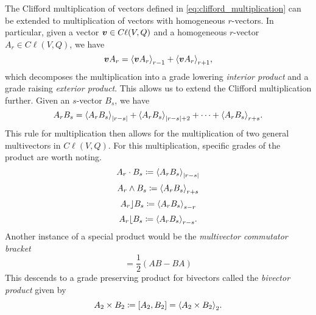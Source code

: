 The Clifford multiplication of vectors defined in \ref{eq:clifford_multiplication} can be extended to multiplication of vectors with homogeneous $r$-vectors.  In particular, given a vector $\boldsymbol{v} \in C\ell(V,Q)$ and a homogeneous $r$-vector $A_r \in C\ell(V,Q)$, we have
\begin{equation}
\label{eq:vector_multiplication}
\blade{v}A_r = \proj{r-1}{\blade{v}A_r} + \proj{r+1}{\blade{v}A_r},
\end{equation}
which decomposes the multiplication into a grade lowering \emph{interior product} and a grade raising \emph{exterior product}.  This allows us to extend the Clifford multiplication further. Given an $s$-vector $B_s$, we have
\begin{equation}
\label{eq:general_clifford_multiplication}
A_r B_s = \proj{|r-s|}{A_rB_s} + \proj{|r-s|+2}{A_rB_s} + \cdots + \proj{r+s}{A_rB_s}.
\end{equation}
This rule for multiplication then allows for the multiplication of two general multivectors in $C\ell(V,Q)$. For this multiplication, specific grades of the product are worth noting.
\begin{equation}
\label{eq:dot}
    A_r \cdot B_s \coloneqq \proj{|r-s|}{A_r B_s}
\end{equation}
\begin{equation}
\label{eq:wedge}
    A_r \wedge B_s \coloneqq \proj{r+s}{A_r B_s}
\end{equation}
\begin{equation}
\label{eq:left_contraction}
    A_r \rfloor B_s \coloneqq \proj{s-r}{A_r B_s}
\end{equation}
\begin{equation}
\label{eq:right_contraction}
    A_r \lfloor B_s \coloneqq \proj{r-s}{A_r B_s}.
\end{equation}
Another instance of a special product would be the \emph{multivector commutator bracket}
\begin{equation}
    [A,B]=\frac{1}{2}(AB-BA)
\end{equation}
This descends to a grade preserving product for bivectors called the \emph{bivector product} given by
\begin{equation}
\label{eq:commutator_product}
    A_2 \times B_2 \coloneqq [A_2,B_2] = \proj{2}{A_2 \times B_2}.
\end{equation}

